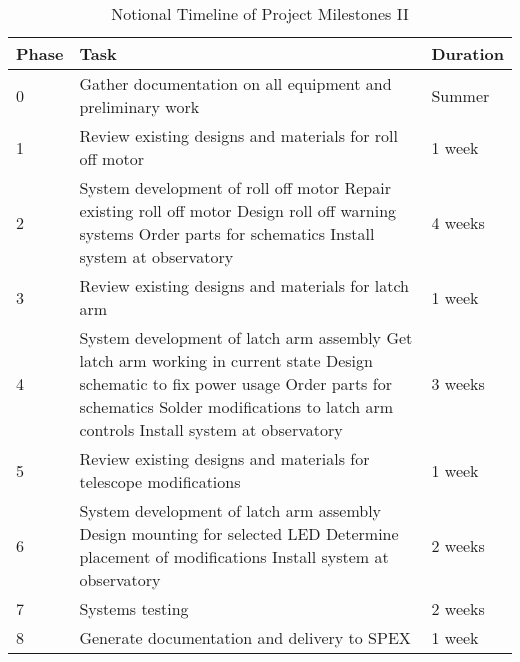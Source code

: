 \documentclass[conference]{IEEEtran} %
\begin{document}
  \begin{table}[hb!]
        \caption{Notional Timeline of Project Milestones II}
        \centering
        \begin{tabularx}{\linewidth}{lXl}
            \toprule %
            Phase & Task & Duration \\
            \midrule %
            0 & Gather documentation on all equipment and preliminary work & Summer \\
            1 & Review existing designs and materials for roll off motor & 1 week \\
            2 & System development of roll off motor
            Repair existing roll off motor
            Design roll off warning systems
            Order parts for schematics
            Install system at observatory & 4 weeks \\
            3 & Review existing designs and materials for latch arm & 1 week \\
            4 & System development of latch arm assembly
            Get latch arm working in current state
            Design schematic to fix power usage
            Order parts for schematics
            Solder modifications to latch arm controls
            Install system at observatory & 3 weeks \\
            5 & Review existing designs and materials for telescope modifications & 1 week \\
            6 & System development of latch arm assembly
            Design mounting for selected LED
            Determine placement of modifications
            Install system at observatory & 2 weeks \\
            7 & Systems testing & 2 weeks \\
            8 & Generate documentation and delivery to SPEX & 1 week \\
            \bottomrule
        \end{tabularx}
    \label{tab:timeline2}
    \end{table}
\end{document}
